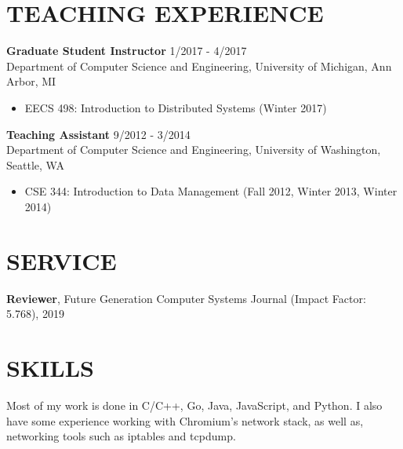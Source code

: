 \documentclass[zhemargin]{res}
\begin{document}
\begin{resume}
\section{\small TEACHING EXPERIENCE}
	\textbf{Graduate Student Instructor} \hfill 1/2017 - 4/2017 \\
	Department of Computer Science and Engineering, University of Michigan, Ann Arbor, MI
	\begin{itemize}
      \item EECS 498: Introduction to Distributed Systems (Winter 2017)
	\end{itemize}
	\textbf{Teaching Assistant} \hfill 9/2012 - 3/2014 \\
	Department of Computer Science and Engineering, University of Washington, Seattle, WA
	\begin{itemize}
      \item CSE 344: Introduction to Data Management (Fall 2012, Winter 2013, Winter 2014)
	\end{itemize}

\section{\small SERVICE}
  \textbf{Reviewer}, Future Generation Computer Systems Journal (Impact Factor: 5.768), 2019 \\

\section{\small SKILLS}
  Most of my work is done in C/C++, Go, Java, JavaScript, and Python. I also
  have some experience working with Chromium's network stack, as well as,
  networking tools such as iptables and tcpdump.

\end{resume}
\end{document}
